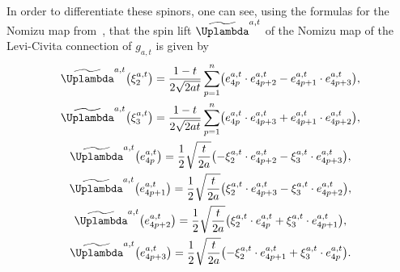 \documentclass[pdftex]{sigma}
\numberwithin{equation}{section}
\begin{document}
		In order to differentiate these spinors, one can see, using the formulas for the Nomizu map from~\cite[p.\ 141]{BFGK}, that the spin lift $\widetilde{\Uplambda}^{a,t}$ of the Nomizu map of the Levi-Civita connection of $g_{a,t}$ is given by
		\begin{gather}
				\widetilde{\Uplambda}^{a,t} \bigl( \xi_2^{a,t} \bigr) = \frac{1-t}{2\sqrt{2at}} \sum_{p=1}^n \bigl( e_{4p}^{a,t} \cdot e_{4p+2}^{a,t} - e_{4p+1}^{a,t} \cdot e_{4p+3}^{a,t} \bigr) ,\nonumber \\
				\widetilde{\Uplambda}^{a,t} \bigl( \xi_3^{a,t} \bigr) = \frac{1-t}{2\sqrt{2at}} \sum_{p=1}^n \bigl( e_{4p}^{a,t} \cdot e_{4p+3}^{a,t} + e_{4p+1}^{a,t} \cdot e_{4p+2}^{a,t} \bigr) ,\nonumber \\
				\widetilde{\Uplambda}^{a,t} \bigl( e_{4p}^{a,t} \bigr) = \frac{1}{2}\sqrt{\frac{t}{2a}} \bigl( - \xi_2^{a,t} \cdot e_{4p+2}^{a,t} - \xi_3^{a,t} \cdot e_{4p+3}^{a,t} \bigr) , \nonumber\\
				\widetilde{\Uplambda}^{a,t} \bigl( e_{4p+1}^{a,t} \bigr) = \frac{1}{2}\sqrt{\frac{t}{2a}} \bigl( \xi_2^{a,t} \cdot e_{4p+3}^{a,t} - \xi_3^{a,t} \cdot e_{4p+2}^{a,t} \bigr) ,\nonumber\\
				\widetilde{\Uplambda}^{a,t} \bigl( e_{4p+2}^{a,t} \bigr) = \frac{1}{2}\sqrt{\frac{t}{2a}} \bigl( \xi_2^{a,t} \cdot e_{4p}^{a,t} + \xi_3^{a,t} \cdot e_{4p+1}^{a,t} \bigr) , \nonumber\\
			\widetilde{\Uplambda}^{a,t} \bigl( e_{4p+3}^{a,t} \bigr) = \frac{1}{2}\sqrt{\frac{t}{2a}} \bigl( - \xi_2^{a,t} \cdot e_{4p+1}^{a,t} + \xi_3^{a,t} \cdot e_{4p}^{a,t} \bigr) .\label{eq:symp_nomizu}
		\end{gather}
		
\end{document}
